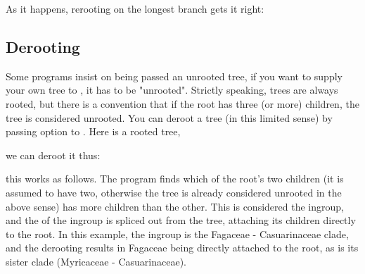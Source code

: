 As it happens, rerooting on the longest branch gets it right:



\subsection{Derooting}

Some programs insist on being passed an unrooted tree, \eg{} if you want to
supply your own tree to \phyml, it has to be "unrooted". Strictly speaking,
\nw{} trees are always rooted, but there is a convention that if the root has
three (or more) children, the tree is considered unrooted. You can deroot a
tree (in this limited sense) by passing option  to \reroot{}. Here
is a rooted tree, 


we can deroot it thus:


this works as follows. The program finds which of the root's two children (it
is assumed to have two, otherwise the tree is already considered unrooted in
the above sense) has more children than the other. This is considered the
ingroup, and the \lca{} of the ingroup is spliced out from the tree, attaching
its children directly to the root. In this example, the ingroup is the Fagaceae
- Casuarinaceae clade, and the derooting results in Fagaceae being directly
attached to the root, as is its sister clade (Myricaceae - Casuarinaceae).
